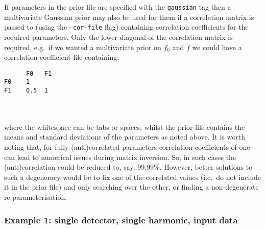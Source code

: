 If parameters in the prior file are specified with the {\tt gaussian} tag then a multivariate Gaussian prior may also be used for them if a correlation matrix
is passed to \lppen (using the {\tt --cor-file} flag) containing correlation coefficients for the required parameters. Only the lower diagonal of the
correlation matrix is required, e.g.\ if we wanted a multivariate prior on $f_0$ and $\dot{f}$ we could have a correlation coefficient file containing:
\begin{lrbox}{\Lst}
\begin{lstlisting}
      F0   F1
F0    1
F1    0.5  1
\end{lstlisting}
\end{lrbox}
\\[5pt] \indent \fbox{\usebox{\Lst}} \\[5pt]
where the whitespace can be tabs or spaces, whilst the prior file contains the means and standard deviations of the parameters as noted above. It is worth noting
that, for fully (anti)correlated parameters correlation coefficients of one can lead to numerical issues during matrix inversion. So, in such cases the
(anti)correlation could be reduced to, say, 99.99\%. However, better solutions to such a degeneracy would be to fix one of the correlated values (i.e.\ do not include
it in the prior file) and only searching over the other, or finding a non-degenerate re-parameterisation.

\subsubsection{Example 1: single detector, single harmonic, input data}\label{sec:example1}


